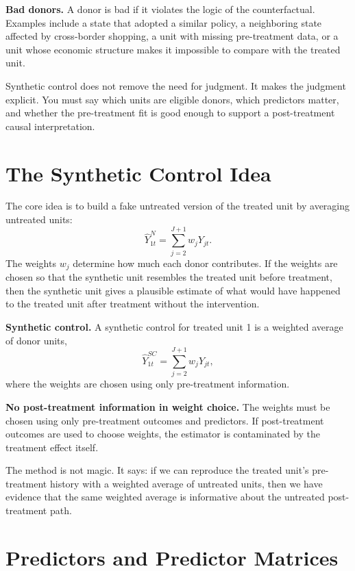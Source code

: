 \begin{boxD}
\textbf{Bad donors.} A donor is bad if it violates the logic of the counterfactual. Examples include a state that adopted a similar policy, a neighboring state affected by cross-border shopping, a unit with missing pre-treatment data, or a unit whose economic structure makes it impossible to compare with the treated unit.
\end{boxD}

Synthetic control does not remove the need for judgment. It makes the judgment explicit. You must say which units are eligible donors, which predictors matter, and whether the pre-treatment fit is good enough to support a post-treatment causal interpretation.

\section{The Synthetic Control Idea}

The core idea is to build a fake untreated version of the treated unit by averaging untreated units:
\[
\widehat{Y}^N_{1t}=\sum_{j=2}^{J+1}w_jY_{jt}.
\]
The weights \(w_j\) determine how much each donor contributes. If the weights are chosen so that the synthetic unit resembles the treated unit before treatment, then the synthetic unit gives a plausible estimate of what would have happened to the treated unit after treatment without the intervention.

\begin{defN}
\textbf{Synthetic control.} A synthetic control for treated unit 1 is a weighted average of donor units,
\[
\widehat{Y}^{SC}_{1t}=\sum_{j=2}^{J+1}w_jY_{jt},
\]
where the weights are chosen using only pre-treatment information.
\end{defN}

\begin{assN}
\textbf{No post-treatment information in weight choice.} The weights must be chosen using only pre-treatment outcomes and predictors. If post-treatment outcomes are used to choose weights, the estimator is contaminated by the treatment effect itself.
\end{assN}

The method is not magic. It says: if we can reproduce the treated unit's pre-treatment history with a weighted average of untreated units, then we have evidence that the same weighted average is informative about the untreated post-treatment path.

\section{Predictors and Predictor Matrices}

